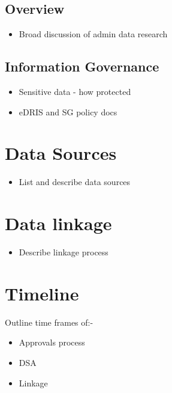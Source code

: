 \documentclass[12pt,]{report}
\providecommand{\tightlist}{%
  \setlength{\itemsep}{0pt}\setlength{\parskip}{0pt}}
\begin{document}
\subsection{Overview}\label{subsec:admin-data-overview}

\begin{itemize}
\tightlist
\item
  Broad discussion of admin data research
\end{itemize}

\subsection{Information Governance}\label{subsec:IG}

\begin{itemize}
\tightlist
\item
  Sensitive data - how protected
\item
  eDRIS and SG policy docs
\end{itemize}

\section{Data Sources}\label{sec:methods-data}

\begin{itemize}
\tightlist
\item
  List and describe data sources
\end{itemize}

\section{Data linkage}\label{sec:methods-linkage}

\begin{itemize}
\tightlist
\item
  Describe linkage process
\end{itemize}

\section{Timeline}\label{sec:methods-timeline}

Outline time frames of:-

\begin{itemize}
\tightlist
\item
  Approvals process
\item
  DSA
\item
  Linkage
\end{itemize}
\end{document}
